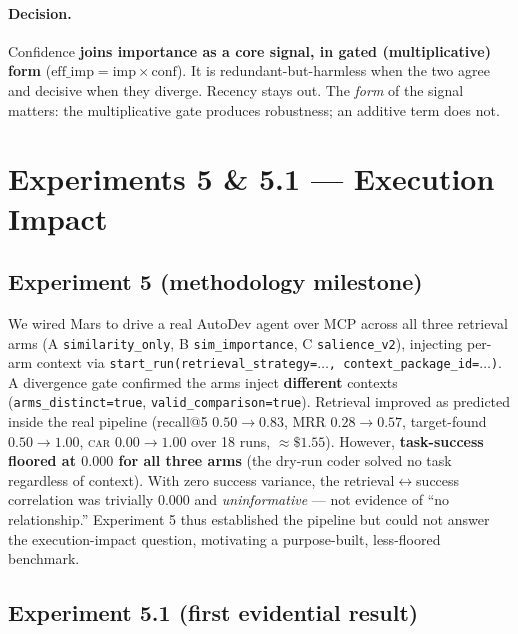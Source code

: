 \documentclass[11pt]{article}
\newcommand{\car}{\textsc{car}}
\begin{document}
\paragraph{Decision.} Confidence \textbf{joins importance as a core signal, in gated
(multiplicative) form} ($\mathrm{eff\_imp} = \mathrm{imp}\times\mathrm{conf}$). It is
redundant-but-harmless when the two agree and decisive when they diverge. Recency stays out.
The \emph{form} of the signal matters: the multiplicative gate produces robustness; an
additive term does not.

\section{Experiments 5 \& 5.1 --- Execution Impact}
\label{sec:exp5}

\subsection{Experiment 5 (methodology milestone)}
We wired Mars to drive a real AutoDev agent over MCP across all three retrieval arms (A
\texttt{similarity\_only}, B \texttt{sim\_importance}, C \texttt{salience\_v2}), injecting
per-arm context via \texttt{start\_run(retrieval\_strategy=$\ldots$, context\_package\_id=$\ldots$)}.
A divergence gate confirmed the arms inject \textbf{different} contexts
(\texttt{arms\_distinct=true}, \texttt{valid\_comparison=true}). Retrieval improved as
predicted inside the real pipeline (recall@5 $0.50\to0.83$, MRR $0.28\to0.57$, target-found
$0.50\to1.00$, \car{} $0.00\to1.00$ over 18 runs, $\approx\$1.55$). However,
\textbf{task-success floored at $0.000$ for all three arms} (the dry-run coder solved no
task regardless of context). With zero success variance, the retrieval$\leftrightarrow$success
correlation was trivially $0.000$ and \emph{uninformative} --- not evidence of ``no
relationship.'' Experiment 5 thus established the pipeline but could not answer the
execution-impact question, motivating a purpose-built, less-floored benchmark.

\subsection{Experiment 5.1 (first evidential result)}
\end{document}
